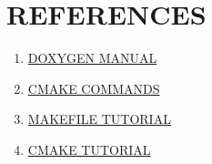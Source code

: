 \documentclass[11pt,utf8]{article}
\begin{document}
\newpage
\section{REFERENCES}
\begin{enumerate}[1]
\item \href{http://www.stack.nl/~dimitri/doxygen/manual/docblocks.html.}{DOXYGEN MANUAL}   
\item \href{http://www.cmake.org/cmake/help/v3.0/command/option.html}{CMAKE COMMANDS}
\item \href{http://gl.developpez.com/tutoriel/outil/makefile/}{MAKEFILE TUTORIAL}
 \item \href{http://www.cmake.org/cmake-tutorial/}{CMAKE TUTORIAL}
\end{enumerate}
\end{document}
